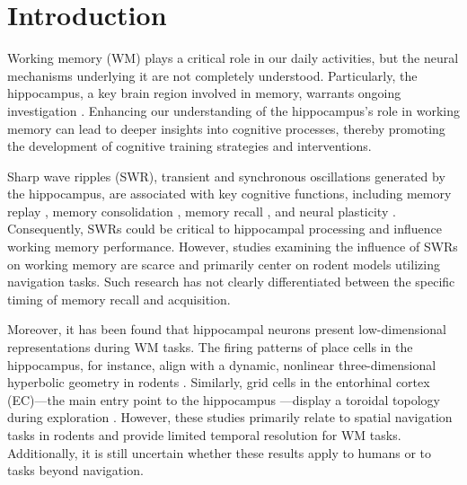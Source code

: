 \section{Introduction}
Working memory (WM) plays a critical role in our daily activities, but the neural mechanisms underlying it are not completely understood. Particularly, the hippocampus, a key brain region involved in memory, warrants ongoing investigation \cite{scoville_loss_1957,squire_legacy_2009,boran_persistent_2019,kaminski_persistently_2017,kornblith_persistent_2017,faraut_dataset_2018,borders_hippocampus_2022,li_functional_2023,dimakopoulos_information_2022}. Enhancing our understanding of the hippocampus's role in working memory can lead to deeper insights into cognitive processes, thereby promoting the development of cognitive training strategies and interventions. 

\indent
Sharp wave ripples (SWR), transient and synchronous oscillations generated by the hippocampus, are associated with key cognitive functions, including memory replay \cite{wilson_reactivation_1994,nadasdy_replay_1999,lee_memory_2002,davidson_hippocampal_2009}, memory consolidation \cite{girardeau_selective_2009,ego-stengel_disruption_2010,fernandez-ruiz_long-duration_2019,kim_corticalhippocampal_2022}, memory recall \cite{wu_hippocampal_2017,norman_hippocampal_2019,norman_hippocampal_2021}, and neural plasticity \cite{behrens_induction_2005,norimoto_hippocampal_2018}. Consequently, SWRs could be critical to hippocampal processing and influence working memory performance. However, studies examining the influence of SWRs on working memory are scarce \cite{jadhav_awake_2012} and primarily center on rodent models utilizing navigation tasks. Such research has not clearly differentiated between the specific timing of memory recall and acquisition.

\indent
Moreover, it has been found that hippocampal neurons present low-dimensional representations during WM tasks. The firing patterns of place cells \cite{okeefe_hippocampus_1971,okeefe_place_1976,ekstrom_cellular_2003,kjelstrup_finite_2008,harvey_intracellular_2009,royer_control_2012} in the hippocampus, for instance, align with a dynamic, nonlinear three-dimensional hyperbolic geometry in rodents \cite{zhang_hippocampal_2022}. Similarly, grid cells in the entorhinal cortex (EC)—the main entry point to the hippocampus \cite{naber_reciprocal_2001,van_strien_anatomy_2009,strange_functional_2014}—display a toroidal topology during exploration \cite{gardner_toroidal_2022}. However, these studies primarily relate to spatial navigation tasks in rodents and provide limited temporal resolution for WM tasks. Additionally, it is still uncertain whether these results apply to humans or to tasks beyond navigation.

